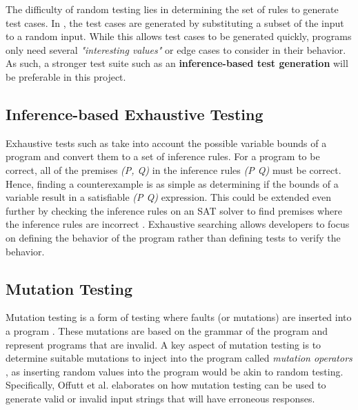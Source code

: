The difficulty of random testing lies in determining the set of rules to generate test cases. In \cite{differentialTesting}, the test cases 
are generated by substituting a subset of the input to a random input. While this allows test cases to be generated quickly, programs only 
need several \emph{"interesting values"} or edge cases to consider in their behavior. As such, a stronger test suite such as an 
\textbf{inference-based test generation} will be preferable in this project.

\subsection{Inference-based Exhaustive Testing}
\label{sec:inferenceTesting}

Exhaustive tests such as \cite{isabelleQuickcheck} take into account the possible variable bounds of a program and convert them to a set of 
inference rules. For a program to be correct, all of the premises \emph{(P, Q)} in the inference rules \emph{(P \rightarrow Q)} must be correct. Hence, 
finding a counterexample is as simple as determining if the bounds of a variable result in a satisfiable \emph{\lnot(P \rightarrow Q)} expression. 
This could be extended even further by checking the inference rules on an SAT solver to find premises where the inference rules are incorrect 
\cite[Ch. 5]{isabelleProof}. Exhaustive searching allows developers to focus on defining the behavior of the program rather than defining 
tests to verify the behavior.

\subsection{Mutation Testing}
\label{sec:mutationTesting}

Mutation testing is a form of testing where faults (or mutations) are inserted into a program \cite{offutt_mutation_2006}. 
These mutations are based on the grammar of the program and represent programs that are invalid. A key aspect of mutation testing is to 
determine suitable mutations to inject into the program called \emph{mutation operators} \cite[Sec. 2]{offutt_mutation_2006}, 
as inserting random values into the program would be akin to random testing. Specifically, Offutt et al. \cite[Sec. 6]{offutt_mutation_2006} 
elaborates on how mutation testing can be used to generate valid or invalid input strings that will have erroneous responses.

